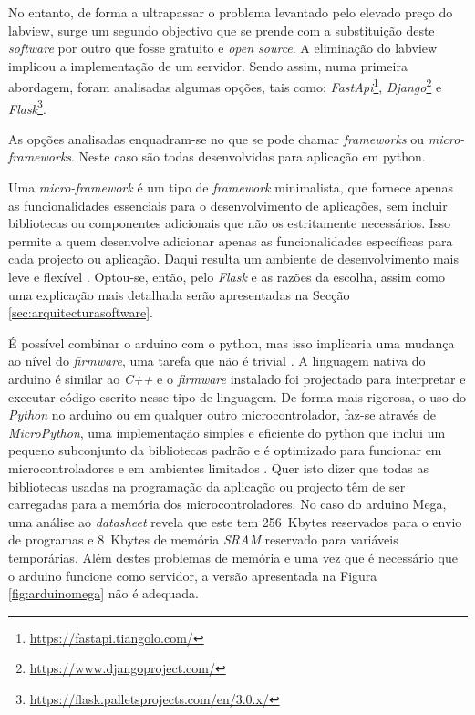 No entanto, de forma a ultrapassar o problema levantado pelo elevado preço do \acrshort{labview}, surge um segundo objectivo que se prende com a substituição deste \textit{software} por outro que fosse gratuito e \textit{open source}. A eliminação do \acrshort{labview} implicou a implementação de um servidor. Sendo assim, numa primeira abordagem, foram analisadas algumas opções, tais como: \textit{FastApi}\footnote{\url{https://fastapi.tiangolo.com/}}, \textit{Django}\footnote{\url{https://www.djangoproject.com/}} e \textit{Flask}\footnote{\url{https://flask.palletsprojects.com/en/3.0.x/}}.

As opções analisadas enquadram-se no que se pode chamar \textit{frameworks} ou \textit{micro-frameworks}. Neste caso são todas desenvolvidas para aplicação em \gls{python}.

Uma \textit{micro-framework} é um tipo de \textit{framework} minimalista, que fornece apenas as funcionalidades essenciais para o desenvolvimento de aplicações, sem incluir bibliotecas ou componentes adicionais que não os estritamente necessários. Isso permite a quem desenvolve adicionar apenas as funcionalidades específicas para cada projecto ou aplicação. Daqui resulta um ambiente de desenvolvimento mais leve e flexível \cite{Flask}.
Optou-se, então, pelo \textit{Flask} e as razões da escolha, assim como uma explicação mais detalhada serão apresentadas na Secção \ref{sec:arquitecturasoftware}.

É possível combinar o \gls{arduino} com o \gls{python}, mas isso implicaria uma mudança ao nível do \textit{firmware}, uma tarefa que não é trivial \cite{Arduinopython}. A linguagem nativa do \gls{arduino} é similar ao \textit{C++} e o \textit{firmware} instalado foi projectado para interpretar e executar código escrito nesse tipo de linguagem. De forma mais rigorosa, o uso do \textit{Python} no \gls{arduino} ou em qualquer outro microcontrolador, faz-se através de \textit{MicroPython}, uma implementação simples e eficiente do \gls{python} que inclui um pequeno subconjunto da bibliotecas padrão e é optimizado para funcionar em microcontroladores e em ambientes limitados \cite{MicroPythondefinition}. Quer isto dizer que todas as bibliotecas usadas na programação da aplicação ou projecto têm de ser carregadas para a memória dos microcontroladores. No caso do \gls{arduino} Mega, uma análise ao \textit{datasheet} \cite{megadatasheet} revela que este tem \SI{256}{Kbytes} reservados para o envio de programas e \SI{8}{Kbytes} de memória \textit{SRAM} reservado para variáveis temporárias.
Além destes problemas de memória e uma vez que é necessário que o \gls{arduino} funcione como servidor, a versão apresentada na Figura \ref{fig:arduinomega} não é adequada.

